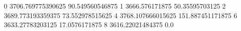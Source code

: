 0 3706.769775390625 90.549560546875
1 3666.576171875 50.35595703125
2 3689.773193359375 73.552978515625
4 3768.107666015625 151.887451171875
6 3633.27783203125 17.0576171875
8 3616.22021484375 0.0
